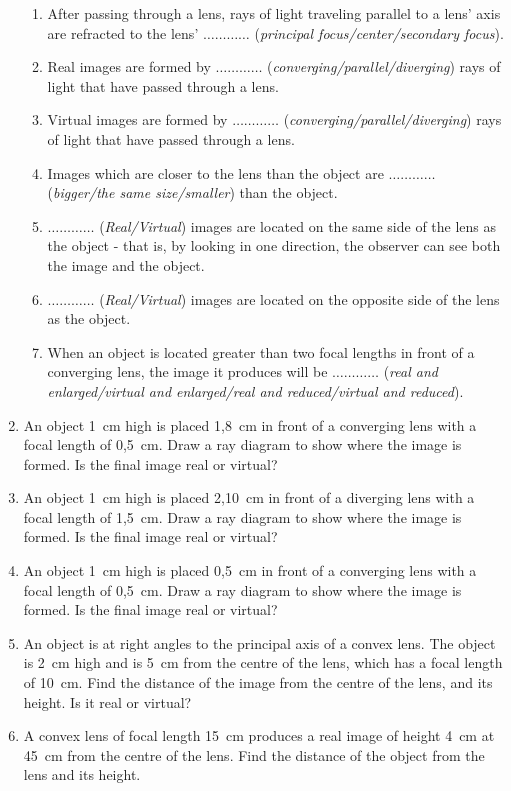 \begin{eocexercises}{}
\begin{enumerate}
{\begin{enumerate}
\item After passing through a lens, rays of light traveling parallel to a lens' axis are refracted to the lens' $\ldots\ldots\ldots\ldots$ (\textit{principal focus/center/secondary focus}).
\item Real images are formed by $\ldots\ldots\ldots\ldots$ (\textit{converging/parallel/diverging}) rays of light that have passed through a lens.
\item Virtual images are formed by $\ldots\ldots\ldots\ldots$ (\textit{converging/parallel/diverging}) rays of light that have passed through a lens.
\item Images which are closer to the lens than the object are $\ldots\ldots\ldots\ldots$ (\textit{bigger/the same size/smaller}) than the object.
\item $\ldots\ldots\ldots\ldots$ (\textit{Real/Virtual}) images are located on the same side of the lens as the object - that is, by looking in one direction, the observer can see both the image and the object.
\item $\ldots\ldots\ldots\ldots$ (\textit{Real/Virtual}) images are located on the opposite side of the lens as the object.
\item When an object is located greater than two focal lengths in front of a converging lens, the image it produces will be $\ldots\ldots\ldots\ldots$ (\textit{real and enlarged/virtual and enlarged/real and reduced/virtual and reduced}).
\end{enumerate}}
\item An object 1~cm high is placed 1,8~cm in front of a converging lens with a focal length of 0,5~cm. Draw a ray diagram to show where the image is formed. Is the final image real or virtual?
\item An object 1~cm high is placed 2,10~cm in front of a diverging lens with a focal length of 1,5~cm. Draw a ray diagram to show where the image is formed. Is the final image real or virtual?
\item An object 1~cm high is placed 0,5~cm in front of a converging lens with a focal length of 0,5~cm. Draw a ray diagram to show where the image is formed. Is the final image real or virtual?
\item An object is at right angles to the principal axis of a convex lens. The object is 2~cm high and is 5~cm from the centre of the lens, which has a focal length of 10~cm. Find the distance of the image from the centre of the lens, and its height. Is it real or virtual?
\item A convex lens of focal length 15~cm produces a real image of height 4~cm at 45~cm from the centre of the lens. Find the distance of the object from the lens and its height.

\end{enumerate}
\end{eocexercises}
